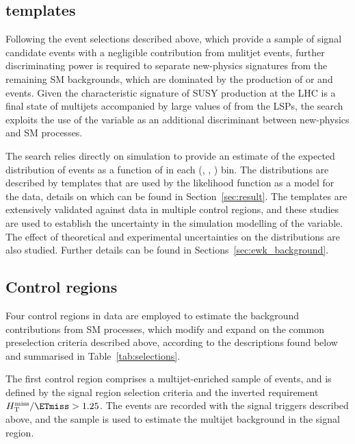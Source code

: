 \subsection{\HTmiss templates}
\label{sec:mht_templates} 

Following the event selections described above, which provide a sample
of signal candidate events with a negligible contribution from
mulitjet events, further discriminating power is required to separate
new-physics signatures from the remaining SM backgrounds, which are
dominated by the production of \ttbar or \wlj and \znunuj
events. Given the characteristic signature of SUSY production at the
LHC is a final state of multijets accompanied by large values of
\ptvecmiss from the LSPs, the search exploits the use of the \HTmiss
variable as an additional discriminant between new-physics and SM
processes.

The search relies directly on simulation to provide an estimate of the
expected distribution of events as a function of \HTmiss in each
(\njet, \nb, \scalht) bin. The distributions are described by
templates that are used by the likelihood function as a model for the
data, details on which can be found in
Section~\ref{sec:result}. The templates are extensively
validated against data in multiple control regions, and these studies
are used to establish the uncertainty in the simulation modelling of
the \HTmiss variable. The effect of theoretical and experimental
uncertainties on the \HTmiss distributions are also studied. Further
details can be found in Sections~\ref{sec:ewk_background}.


\subsection{Control regions}
\label{sec:control_regions}

Four control regions in data are employed to estimate the background
contributions from SM processes, which modify and expand on the
common preselection criteria described above, according to the
descriptions found below and summarised in Table~\ref{tab:selections}.

The first control region comprises a multijet-enriched sample of
events, and is defined by the signal region selection criteria and the
inverted requirement $\HTmiss / \ETmiss > 1.25$. The events are
recorded with the signal triggers described above, and the sample is
used to estimate the multijet background in the signal region.
 
